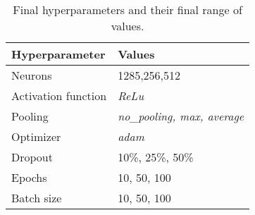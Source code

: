 \begin{table}[t]
    \centering
    \begin{tabular}{|l|l|}
    \hline
    \textbf{Hyperparameter} & \textbf{Values}                    \\ \hline\hline
    Neurons                 & 1285,256,512                       \\ \hline
    Activation function     & \textit{ReLu}                      \\ \hline
    Pooling                 & \textit{no\_pooling, max, average} \\ \hline
    Optimizer               & \textit{adam}                      \\ \hline
    Dropout                 & 10\%, 25\%, 50\%                   \\ \hline
    Epochs                  & 10, 50, 100                        \\ \hline
    Batch size              & 10, 50, 100                        \\ \hline
    \end{tabular}
    \caption{Final hyperparameters and their final range of values.}
    \label{tab:final_params}
\end{table}